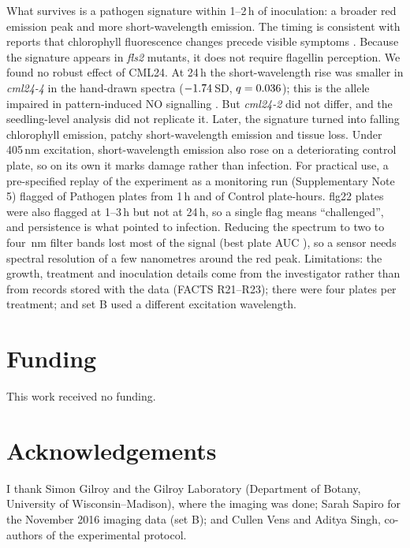 \documentclass[11pt,a4paper]{article}
\begin{document}
What survives is a pathogen signature within 1--2\,h of inoculation: a broader red
emission peak and more short-wavelength emission. The timing is consistent with reports that
chlorophyll fluorescence changes precede visible symptoms \citep{bonfig2006}. Because the
signature appears in \textit{fls2} mutants, it does not require flagellin perception.
We found no robust effect of CML24. At 24\,h the short-wavelength rise was smaller in
\textit{cml24-4} in the hand-drawn spectra ($-1.74$\,SD, $q=0.036$); this is the
allele impaired in pattern-induced NO signalling \citep{ma2008}. But \textit{cml24-2} did not
differ, and the seedling-level analysis did not replicate it. Later, the signature turned into
falling chlorophyll emission, patchy short-wavelength emission and tissue loss. Under 405\,nm
excitation, short-wavelength emission also rose on a deteriorating control plate, so on its own it
marks damage rather than infection.
For practical use, a pre-specified replay of the experiment as a monitoring run (Supplementary
Note 5) flagged \alarmPathFirstOne{} of \nAlarmPathPlates{} Pathogen plates from 1\,h and
\alarmCtrlHits{} of \alarmCtrlCells{} Control plate-hours. flg22 plates were also flagged at 1--3\,h
but not at 24\,h, so a single flag means ``challenged'', and persistence is what pointed to infection.
Reducing the spectrum to two to four \bandWidthNm\,nm filter bands lost most of the signal (best plate
AUC \bandFiltAucMax), so a sensor needs spectral resolution of a few nanometres around the red peak.
Limitations: the growth, treatment and inoculation details come from the investigator rather than
from records stored with the data (FACTS R21--R23); there were four plates per treatment; and set B
used a different excitation wavelength.



\section*{Funding}
This work received no funding.

\section*{Acknowledgements}
I thank Simon Gilroy and the Gilroy Laboratory (Department of Botany, University of
Wisconsin--Madison), where the imaging was done; Sarah Sapiro for the November 2016 imaging data
(set B); and Cullen Vens and Aditya Singh, co-authors of the experimental protocol.



\end{document}
